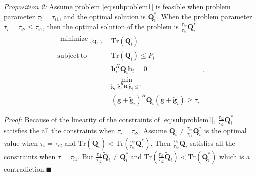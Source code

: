 \documentclass[conference]{IEEEtran}
\begin{document}
\emph{Proposition 2:} Assume problem \eqref{eq:subproblem1} is feasible when problem parameter $\tau_i = \tau_{i1}$, and the optimal solution is $\mathbf{Q}_i^*$. When the problem parameter $\tau_i = \tau_{i2} \leq \tau_{i1}$, then the optimal solution of the problem is $\frac{\tau_{i2}}{\tau_{i1}}\mathbf{Q}_i^*$ 
\begin{equation}\label{eq:subproblem1}
\begin{array}{ll}
\begin{split}
\mathop{\text{minimize}}_{\substack{\{\mathbf{Q}_{i}}\}} 
\end{split}  
& \mathrm{Tr}(\mathbf{Q}_i)\\
\mathrm{subject~to} &\mathrm{Tr}(\mathbf{Q}_i) \leq P_i\\
& \mathbf{h}_i^H \mathbf{Q}_i \mathbf{h}_i= 0\\
&\min_{\tilde{\mathbf{g}}_i: \tilde{\mathbf{g}}_i^H \mathbf{R}_i\tilde{\mathbf{g}}_i \leq 1}\\
&(\bar{\mathbf{g}}+\tilde{\mathbf{g}}_i)^H\mathbf{Q}_i(\bar{\mathbf{g}}+\tilde{\mathbf{g}}_i) \geq  \tau_{i}
\end{array}.
\end{equation}

\emph{Proof:} Because of the linearity of the constraints of \eqref{eq:subproblem1},  $\frac{\tau_{i2}}{\tau_{i1}}\mathbf{Q}_i^*$ satisfies the all the constraints when $\tau_i = \tau_{i2}$. Assume $\tilde{\mathbf{Q}}_i \neq \frac{\tau_{i2}}{\tau_{i1}}\mathbf{Q}_i^*$ is the optimal value when $\tau_i = \tau_{i2}$ and $\mathrm{Tr}(\tilde{\mathbf{Q}}_i) < \mathrm{Tr}(\frac{\tau_{i2}}{\tau_{i1}}\mathbf{Q}_i^*)$. Then $\frac{\tau_{i1}}{\tau_{i2}}\tilde{\mathbf{Q}}_i$ satisfies all the constraints when $\tau = \tau_{i1}$. But $\frac{\tau_{i1}}{\tau_{i2}}\tilde{\mathbf{Q}}_i \neq \mathbf{Q}_i^*$ and $\mathrm{Tr}(\frac{\tau_{i1}}{\tau_{i2}}\tilde{\mathbf{Q}}_i) < \mathrm{Tr}(\mathbf{Q}_i^*)$ which is a contradiction.$\blacksquare$
\end{document}
